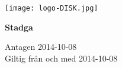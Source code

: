 \begin{titlepage}
\begin{center}
\texttt{[image: logo-DISK.jpg]}
\vfill

\fontsize{50}{60}\selectfont \bfseries Stadga

\vfill

\normalsize Antagen 2014-10-08\\Giltig från och med 2014-10-08


\end{center}
\end{titlepage}
